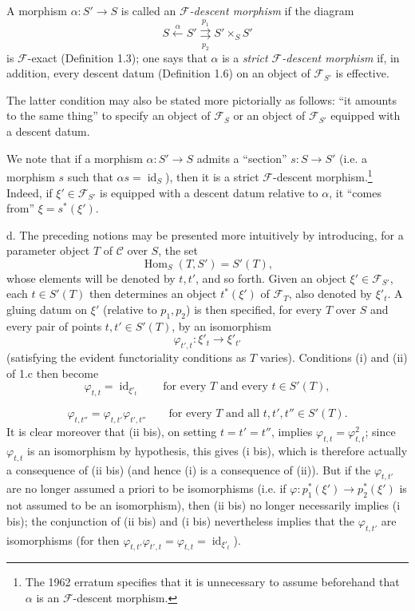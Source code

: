  A morphism $\alpha:S'\longrightarrow S$ is called an
\emph{$\mathcal F$-descent morphism} if the diagram
\[
  S\xleftarrow{\alpha}S'
  \overset{p_1}{\underset{p_2}{\rightrightarrows}}S'\times_S S'
\]
is $\mathcal F$-exact (Definition 1.3); one says that $\alpha$ is a
\emph{strict $\mathcal F$-descent morphism} if, in addition, every descent
datum (Definition 1.6) on an object of $\mathcal F_{S'}$ is effective.

The latter condition may also be stated more pictorially as follows: “it
amounts to the same thing” to specify an object of $\mathcal F_S$ or an object
of $\mathcal F_{S'}$ equipped with a descent datum.

We note that if a morphism $\alpha:S'\longrightarrow S$ admits a “section”
$s:S\longrightarrow S'$ (i.e. a morphism $s$ such that
$\alpha s=\operatorname{id}_S$), then it is a strict
$\mathcal F$-descent morphism.\footnote{The 1962 erratum specifies that it is
unnecessary to assume beforehand that $\alpha$ is an $\mathcal F$-descent
morphism.} Indeed, if $\xi'\in\mathcal F_{S'}$ is equipped with a descent datum
relative to $\alpha$, it “comes from” $\xi=s^*(\xi')$.

\medskip\noindent
d. The preceding notions may be presented more intuitively by introducing, for
a parameter object $T$ of $\mathcal C$ over $S$, the set
\[
  \operatorname{Hom}_S(T,S')=S'(T),
\]
whose elements will be denoted by $t,t'$, and so forth. Given an object
$\xi'\in\mathcal F_{S'}$, each $t\in S'(T)$ then determines an object
$t^*(\xi')$ of $\mathcal F_T$, also denoted by $\xi'_t$. A gluing datum on
$\xi'$ (relative to $p_1,p_2$) is then specified, for every $T$ over $S$ and
every pair of points $t,t'\in S'(T)$, by an isomorphism
\[
  \varphi_{t',t}:\xi'_t\longrightarrow\xi'_{t'}
\]
(satisfying the evident functoriality conditions as $T$ varies). Conditions (i)
and (ii) of 1.c then become
\[
  \tag{i bis}
  \varphi_{t,t}=\operatorname{id}_{\xi'_t}
  \qquad\text{for every $T$ and every $t\in S'(T)$},
\]

\[
  \tag{ii bis}
  \varphi_{t,t''}=\varphi_{t,t'}\varphi_{t',t''}
  \qquad\text{for every $T$ and all $t,t',t''\in S'(T)$}.
\]
It is clear moreover that (ii bis), on setting $t=t'=t''$, implies
$\varphi_{t,t}=\varphi_{t,t}^2$; since $\varphi_{t,t}$ is an isomorphism by
hypothesis, this gives (i bis), which is therefore actually a consequence of
(ii bis) (and hence (i) is a consequence of (ii)). But if the
$\varphi_{t,t'}$ are no longer assumed a priori to be isomorphisms (i.e. if
$\varphi:p_1^*(\xi')\longrightarrow p_2^*(\xi')$ is not assumed to be an
isomorphism), then (ii bis) no longer necessarily implies (i bis); the
conjunction of (ii bis) and (i bis) nevertheless implies that the
$\varphi_{t,t'}$ are isomorphisms (for then
$\varphi_{t,t'}\varphi_{t',t}=\varphi_{t,t}=\operatorname{id}_{\xi'_t}$).

